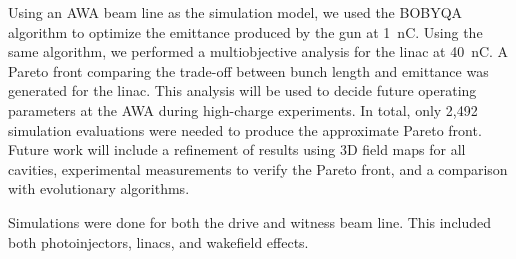 \documentclass{iitthesis}
\begin{document}
Using an AWA beam line as the simulation model, we used the BOBYQA algorithm 
to optimize the emittance produced by the gun at \SI{1}{nC}.
Using the same algorithm, we performed a multiobjective analysis for the linac at \SI{40}{nC}. 
A Pareto front comparing the trade-off between bunch length and emittance was generated for the linac. 
This analysis will be used to decide future operating parameters at the AWA during high-charge experiments.
In total, only 2,492 simulation evaluations were needed to produce the approximate Pareto front.
Future work will include a refinement of results using 3D field maps for all 
cavities, experimental measurements to verify the 
Pareto front, and a comparison with evolutionary algorithms.

 \label{sec:ga}
Simulations were done for both the drive and witness beam line. 
This included both photoinjectors, linacs, and wakefield effects. 






\end{document}
